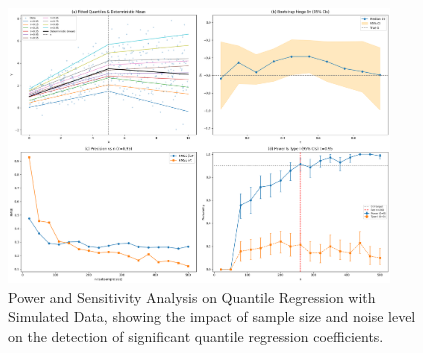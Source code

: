 \begin{figure}[!h]
\centering
\includegraphics[width=0.9\textwidth]{../results/preliminary_results/power_sensitivity_evaluation_test.png}
\caption{Power and Sensitivity Analysis on Quantile Regression with Simulated Data, showing the impact of sample size and noise level on the detection of significant quantile regression coefficients.}
\label{fig:power_sensitivity_analysis_simulation}
\end{figure}
